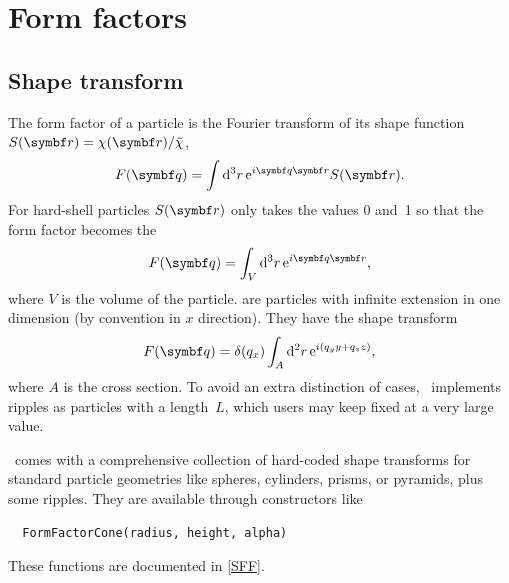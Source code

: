 \section{Form factors}


\subsection{Shape transform}

The form factor %
of a particle is the Fourier transform
of its shape function $S(\r)=\chi(\r)/\tilde\chi$,
%
%
%
\begin{equation}
  F(\q)=\int {\rm d}^3r\, {\rm e}^{i\q\r} S(\r).
\end{equation}
For hard-shell particles %
$S(\r)$ only takes the values 0 and~1
so that the form factor becomes
the 
%
\begin{equation}\label{EFFhardshell}
  F(\q)=\int_V {\rm d}^3r\, {\rm e}^{i\q\r},
\end{equation}
where $V$ is the volume of the particle.
%
%
 are particles with infinite extension in one dimension
(by convention in $x$ direction).
They have the shape transform
\begin{equation}\label{EFFripple}
  F(\q)=\delta(q_x)\int_A {\rm d}^2r\, {\rm e}^{i(q_y y + q_z z)},
\end{equation}
where $A$ is the cross section.
To avoid an extra distinction of cases,
\BornAgain\ implements ripples as particles with a  length~$L$,
which users may keep fixed at a very large value.

\BornAgain\ comes with a comprehensive collection of hard-coded
shape transforms for standard particle geometries like
spheres, cylinders, prisms, or pyramids,
plus some ripples.
They are available through constructors like
\begin{lstlisting}
  FormFactorCone(radius, height, alpha)
\end{lstlisting}
These functions are documented in \cref{SFF}.

